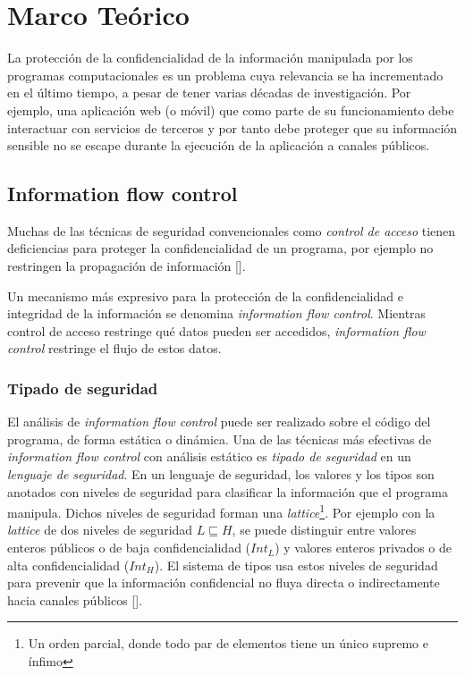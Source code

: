 \chapter{Marco Teórico}

	La protección de la confidencialidad de la información manipulada por los programas computacionales es un problema cuya relevancia se ha incrementado en el último tiempo, a pesar de tener varias décadas de investigación. Por ejemplo, una aplicación web (o móvil) que como parte de su funcionamiento debe interactuar con servicios de terceros y por tanto debe proteger que su información sensible no se escape durante la ejecución de la aplicación a canales públicos.

\section{Information flow control}

	Muchas de las técnicas de seguridad convencionales como \textit{control de acceso} tienen deficiencias para proteger la confidencialidad de un programa, por ejemplo no restringen la propagación de información [].%

	Un mecanismo más expresivo para la protección de la confidencialidad e integridad de la información se denomina \textit{information flow control}. Mientras control de acceso restringe qué datos pueden ser accedidos, \textit{information flow control} restringe el flujo de estos datos.

	\subsection{Tipado de seguridad}
	El análisis de \textit{information flow control} puede ser realizado sobre el código del programa, de forma estática o dinámica. Una de las técnicas más efectivas de \textit{information flow control} con análisis estático es \textit{tipado de seguridad} en un \textit{lenguaje de seguridad}. En un lenguaje de seguridad, los valores y los tipos son anotados con niveles de seguridad para clasificar la información que el programa manipula. Dichos niveles de seguridad forman una \textit{lattice}\footnote{Un orden parcial, donde todo par de elementos tiene un único supremo e ínfimo}. Por ejemplo con la \textit{lattice} de dos niveles de seguridad $L \sqsubseteq H$, se puede distinguir entre valores enteros públicos o de baja confidencialidad ($Int_L$) y valores enteros privados o de alta confidencialidad ($Int_H$). El sistema de tipos usa estos niveles de seguridad para prevenir que la información confidencial no fluya directa o indirectamente hacia canales públicos []. %

